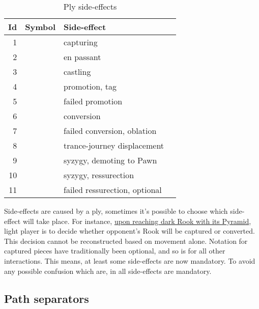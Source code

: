 \begin{table}[!h]
\centering
\begin{tabular}{ rlll }
\toprule
\textbf{Id} & \textbf{Symbol}      & \textbf{Side-effect}                   \\
\midrule
1           & \alg{*}              & capturing                              \\
2           & \alg{:}              & en passant                             \\
3           & \alg{\&}             & castling                               \\
4           & \alg{=}              & promotion, tag                         \\
5           & \alg{==}             & failed promotion                       \\
6           & \alg{\%}             & conversion                             \\
7           & \alg{\%\%}           & failed conversion, oblation            \\
8           & \alg{<}              & trance-journey displacement            \\
9           & \alg{>}              & syzygy, demoting to Pawn               \\
10          & \alg{\$}             & syzygy, ressurection                   \\
11          & \alg{\$\$}           & failed ressurection, optional          \\
\bottomrule
\end{tabular}
\caption{Ply side-effects}
\label{tbl:Appendix/Summary/Ply side-effects}
\end{table}

Side-effects are caused by a ply, sometimes it's possible to choose which side-effect will take place.
For instance,
\hyperref[fig:scn_ma_09_conversion_pyramid_activated]{upon reaching dark Rook with its Pyramid}, light
player is to decide whether opponent's Rook will be captured or converted. This decision cannot be
reconstructed based on movement alone. Notation for captured pieces have traditionally been optional,
and so is for all other interactions. This means, at least some side-effects are now mandatory. To
avoid any possible confusion which are, in  all side-effects are mandatory.

\clearpage %

\subsection*{Path separators}
\label{sec:Appendix/Summary/Path separators}

